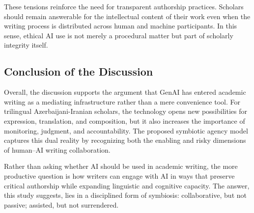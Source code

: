 \documentclass[12pt]{article}
\begin{document}
These tensions reinforce the need for transparent authorship practices. Scholars should remain answerable for the intellectual content of their work even when the writing process is distributed across human and machine participants. In this sense, ethical AI use is not merely a procedural matter but part of scholarly integrity itself.

\subsection{Conclusion of the Discussion}
Overall, the discussion supports the argument that GenAI has entered academic writing as a mediating infrastructure rather than a mere convenience tool. For trilingual Azerbaijani-Iranian scholars, the technology opens new possibilities for expression, translation, and composition, but it also increases the importance of monitoring, judgment, and accountability. The proposed symbiotic agency model captures this dual reality by recognizing both the enabling and risky dimensions of human--AI writing collaboration.

Rather than asking whether AI should be used in academic writing, the more productive question is how writers can engage with AI in ways that preserve critical authorship while expanding linguistic and cognitive capacity. The answer, this study suggests, lies in a disciplined form of symbiosis: collaborative, but not passive; assisted, but not surrendered.
\end{document}
